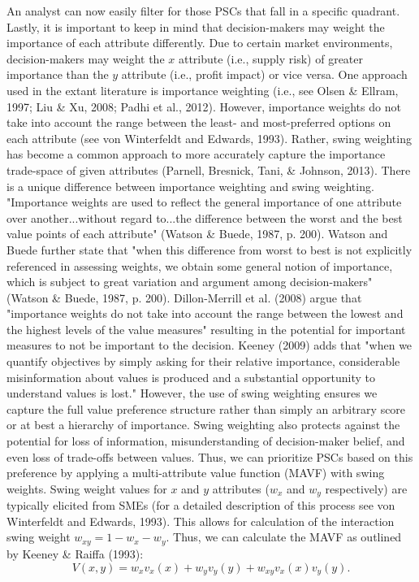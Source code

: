 \documentclass[twocolumn]{svjour3}       %
\begin{document}
An analyst can now easily filter for those PSCs that fall in a specific quadrant.  Lastly, it is important to keep in mind that decision-makers may weight the importance of each attribute differently. Due to certain market environments, decision-makers may weight the $x$ attribute (i.e., supply risk) of greater importance than the $y$ attribute (i.e., profit impact) or vice versa.  One approach used in the extant literature is importance weighting (i.e., see Olsen \& Ellram, 1997; Liu \& Xu, 2008; Padhi et al., 2012).  However, importance weights do not take into account the range between the least- and most-preferred options on each attribute (see von Winterfeldt and Edwards, 1993).  Rather, swing weighting has become a common approach to more accurately capture the importance trade-space of given attributes (Parnell, Bresnick, Tani, \& Johnson, 2013). There is a unique difference between importance weighting and swing weighting. "Importance weights are used to reflect the general importance of one attribute over another...without regard to...the difference between the worst and the best value points of each attribute" (Watson \& Buede, 1987, p. 200). Watson and Buede further state that "when this difference from worst to best is not explicitly referenced in assessing weights, we obtain some general notion of importance, which is subject to great variation and argument among decision-makers" (Watson \& Buede, 1987, p. 200). Dillon-Merrill et al. (2008) argue that "importance weights do not take into account the range between the lowest and the highest levels of the value measures" resulting in the potential for important measures to not be important to the decision. Keeney (2009) adds that "when we quantify objectives by simply asking for their relative importance, considerable misinformation about values is produced and a substantial opportunity to understand values is lost."  However, the use of swing weighting ensures we capture the full value preference structure rather than simply an arbitrary score or at best a hierarchy of importance. Swing weighting also protects against the potential for loss of information, misunderstanding of decision-maker belief, and even loss of trade-offs between values.  Thus, we can prioritize PSCs based on this preference by applying a multi-attribute value function (MAVF) with swing weights. Swing weight values for $x$ and $y$ attributes ($w_x$ and $w_y$ respectively) are typically elicited from SMEs (for a detailed description of this process see von Winterfeldt and Edwards, 1993). This allows for calculation of the interaction swing weight $w_{xy} = 1 - w_x - w_y$. Thus, we can calculate the MAVF as outlined by Keeney \& Raiffa (1993):
\begin{equation}
\label{eqn:2}
V\left(x, y\right) = w_x v_x\left(x\right) + w_y v_y\left(y\right) + w_{xy} v_x\left(x\right)v_y\left(y\right).
\end{equation}
\end{document}
